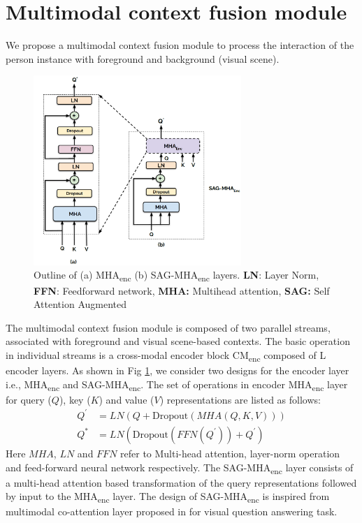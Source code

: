 \section{Multimodal context fusion module}

We propose a multimodal context fusion module to process the interaction of the person instance with foreground and background (visual scene).
\begin{figure}[h!]
    \centering
    \includegraphics[width=0.7\textwidth]{figures/SAG_MHA.png}
    \caption{Outline of (a) MHA\textsubscript{enc} (b) SAG-MHA\textsubscript{enc} layers. \textbf{LN}: Layer Norm, \textbf{FFN}: Feedforward network, \textbf{MHA:} Multihead attention, \textbf{SAG:} Self Attention Augmented}
    \label{encoder block}
\end{figure}
The multimodal context fusion module is composed of two parallel streams, associated with foreground and visual scene-based contexts. The basic operation in individual streams is a cross-modal encoder block CM\textsubscript{enc} composed of L encoder layers. As shown in Fig \ref{encoder block}, we consider two designs for the encoder layer i.e., MHA\textsubscript{enc} and SAG-MHA\textsubscript{enc}.  
The set of operations in encoder MHA\textsubscript{enc} layer for query ($Q$), key ($K$) and value ($V$) representations are listed as follows:
\begin{equation} \label{MHAEnc operation}
\begin{split}
 Q^{'} & = LN(Q + \text{Dropout}(MHA(Q,K,V))) \\ 
Q^{*} & =LN(\text{Dropout}(FFN(Q^{'}))+Q^{'})
\end{split}
\end{equation}
Here $MHA$, $LN$ and $FFN$ refer to Multi-head attention, layer-norm operation and feed-forward neural network respectively. The SAG-MHA\textsubscript{enc} layer consists of a multi-head attention based transformation of the query representations followed by input to the MHA\textsubscript{enc} layer. The design of SAG-MHA\textsubscript{enc} is inspired from multimodal co-attention layer proposed in \cite{yu2019mcan} for visual question answering task.

